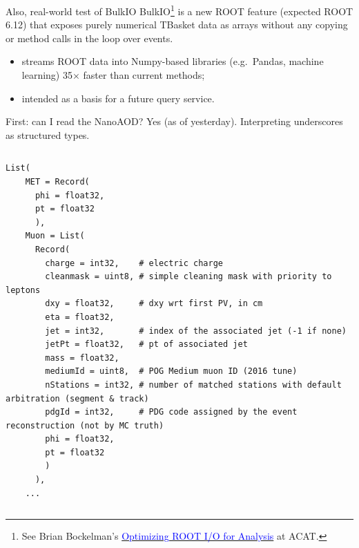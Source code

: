 \documentclass{beamer}
\begin{document}
\begin{frame}{Also, real-world test of BulkIO}
\vspace{0.5 cm}
BulkIO\footnote{See Brian Bockelman's \href{https://indico.cern.ch/event/567550/contributions/2627167/}{\textcolor{blue}{Optimizing ROOT I/O for Analysis}} at ACAT.} is a new ROOT feature (expected ROOT 6.12) that exposes purely numerical TBasket data as arrays without any copying or method calls in the loop over events.

\vspace{0.75 cm}

\vspace{0.25 cm}
\begin{itemize}\setlength{\itemsep}{0.5 cm}
\item<3-> streams ROOT data into Numpy-based libraries (e.g.\ Pandas, machine learning) 35$\times$ faster than current methods;
\item<4-> intended as a basis for a future query service.
\end{itemize}
\end{frame}

\begin{frame}[fragile]{First: can I read the NanoAOD?}
\vspace{0.5 cm}
Yes (as of yesterday). Interpreting underscores as structured types.

\begin{columns}
\scriptsize
\begin{verbatim}
List(
    MET = Record(
      phi = float32,
      pt = float32
      ),
    Muon = List(
      Record(
        charge = int32,    # electric charge
        cleanmask = uint8, # simple cleaning mask with priority to leptons
        dxy = float32,     # dxy wrt first PV, in cm
        eta = float32,
        jet = int32,       # index of the associated jet (-1 if none)
        jetPt = float32,   # pt of associated jet
        mass = float32,
        mediumId = uint8,  # POG Medium muon ID (2016 tune)
        nStations = int32, # number of matched stations with default arbitration (segment & track)
        pdgId = int32,     # PDG code assigned by the event reconstruction (not by MC truth)
        phi = float32,
        pt = float32
        )
      ),
    ...
\end{verbatim}
\end{columns}
\end{frame}
\end{document}

